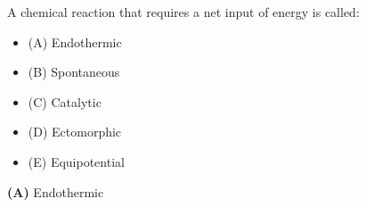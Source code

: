 

A chemical reaction that requires a net input of energy is called:

\begin{itemize}
\item{(A)} Endothermic
\vskip 5pt 
\item{(B)} Spontaneous
\vskip 5pt 
\item{(C)} Catalytic
\vskip 5pt 
\item{(D)} Ectomorphic
\vskip 5pt 
\item{(E)} Equipotential
\end{itemize}







{\bf (A)} Endothermic
 










